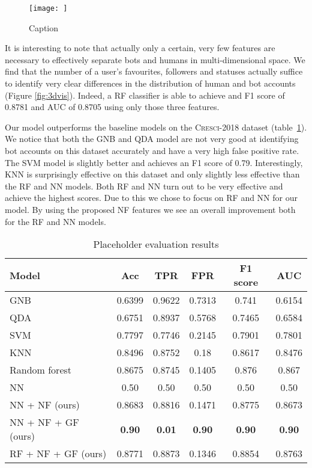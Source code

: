 \begin{figure}
    \centering
    \texttt{[image: ]}
    \caption{Caption}
    \label{fig:my_label}
\end{figure}

\noindent It is interesting to note that actually only a certain, very few features are necessary to effectively separate bots and humans in multi-dimensional space. We find that the number of a user's favourites, followers and statuses actually suffice to identify very clear differences in the distribution of human and bot accounts (Figure \ref{fig:3dvis}). Indeed, a RF classifier is able to achieve and F1 score of 0.8781 and AUC of 0.8705 using only those three features.

Our model outperforms the baseline models on the \textsc{Cresci-2018} dataset (table~\ref{tab:results}). We notice that both the GNB and QDA model are not very good at identifying bot accounts on this dataset accurately and have a very high false positive rate. The SVM model is slightly better and achieves an F1 score of 0.79. Interestingly, KNN is surprisingly effective on this dataset and only slightly less effective than the RF and NN models. Both RF and NN turn out to be very effective and achieve the highest scores. Due to this we chose to focus on RF and NN for our model. By using the proposed NF features we see an overall improvement both for the RF and NN models.

\begin{table}[t]
\centering
\begin{tabular}{@{}lccccc@{}}
\toprule
\textbf{Model} & \textbf{Acc} & \textbf{TPR} & \textbf{FPR} & \textbf{F1 score} & \textbf{AUC} \\ \midrule
GNB             & 0.6399 & 0.9622 & 0.7313 & 0.741  & 0.6154 \\
QDA             & 0.6751 & 0.8937 & 0.5768 & 0.7465 & 0.6584 \\
SVM             & 0.7797 & 0.7746 & 0.2145 & 0.7901 & 0.7801 \\
KNN             & 0.8496 & 0.8752 & 0.18   & 0.8617 & 0.8476 \\
Random forest   & 0.8675 & 0.8745 & 0.1405 & 0.876  & 0.867 \\
NN              & 0.50   & 0.50   & 0.50   & 0.50   & 0.50 \\ \midrule
NN + NF (ours)  & 0.8683 & 0.8816 & 0.1471 & 0.8775 & 0.8673 \\
NN + NF + GF (ours) & \textbf{0.90} & \textbf{0.01} & \textbf{0.90} & \textbf{0.90} & \textbf{0.90} \\
RF + NF + GF (ours) & 0.8771 & 0.8873 & 0.1346 & 0.8854 & 0.8763 \\
\bottomrule
\end{tabular}
\caption{Placeholder evaluation results}
\label{tab:results}
\end{table}